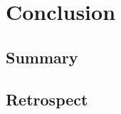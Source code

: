 
\chapter{Conclusion}

\ifpdf
    \graphicspath{{12_conclusion/figures/PNG/}{12_conclusion/figures/PDF/}{12_conclusion/figures/}}
\else
    \graphicspath{{12_conclusion/figures/EPS/}{12_conclusion/figures/}}
\fi


\section{Summary}

\section{Retrospect}